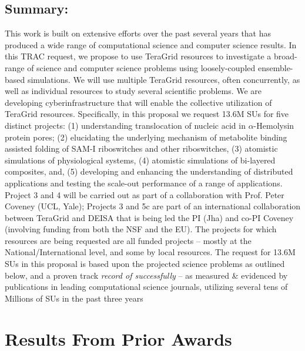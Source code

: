 \documentclass[a4paper,10pt]{article}
\newcommand{\up}{\vspace*{-1em}}
\begin{document}
\subsection*{Summary:} 
This work is built on extensive efforts over the past several years that has produced a wide range of computational science and computer science results. In this TRAC request, we propose to use TeraGrid resources to investigate a broad-range of science and computer science problems using loosely-coupled ensemble-based simulations.  We will use multiple TeraGrid resources, often concurrently, as well as individual resources to study several scientific problems. We are developing cyberinfrastructure that will enable the collective utilization of TeraGrid resources.  Specifically, in this proposal we request 13.6M SUs for five distinct projects: (1) understanding translocation of nucleic acid in $\alpha$-Hemolysin protein pores; (2) elucidating the underlying mechanism of metabolite binding assisted folding of SAM-I riboswitches and other riboswitches, (3) atomistic simulations of physiological systems, (4) atomistic simulations of bi-layered composites, and, (5) developing and enhancing the understanding of distributed applications and testing the scale-out performance of a range of applications.  Project 3 and 4 will be carried out as part of a collaboration with Prof. Peter Coveney (UCL, Yale); Projects 3 and 5c are part of an international collaboration between TeraGrid and DEISA that is being led the PI (Jha) and co-PI Coveney (involving funding from both the NSF and the EU). The projects for which resources are being requested are all funded projects -- mostly at the National/International level, and some by local resources.  The request for 13.6M SUs in this proposal is based upon the projected science problems as outlined below, and a proven track {\it record of successfully} -- as measured \& evidenced by publications in leading computational science journals, utilizing several tens of Millions of SUs in the past three years

\up\up
\section{Results From Prior Awards}
\up


\end{document}
